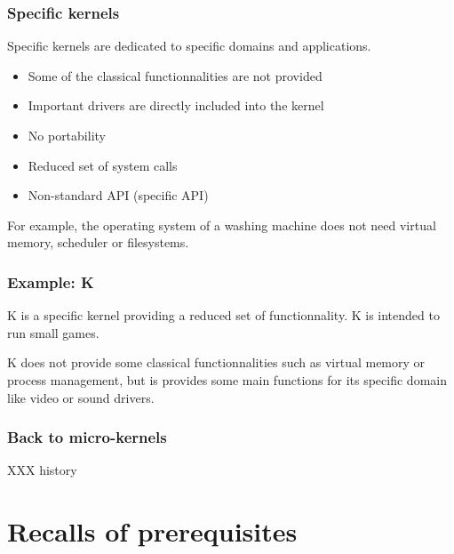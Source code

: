 %
%

\begin{frame}
  \frametitle{Specific kernels}

  Specific kernels are dedicated to specific domains and applications.

  \begin{itemize}
  \item
    Some of the classical functionnalities are not provided
  \item
    Important drivers are directly included into the kernel
  \item
    No portability
  \item
    Reduced set of system calls
  \item
    Non-standard API (specific API)
  \end{itemize}

  \-

  For example, the operating system of a washing machine does not need
  virtual memory, scheduler or filesystems.

\end{frame}

%
%

\begin{frame}
  \frametitle{Example: K}

  K is a specific kernel providing a reduced set of functionnality. K
  is intended to run small games.

  \begin{center}
  \end{center}

  K does not provide some classical functionnalities such as virtual
  memory or process management, but is provides some main functions
  for its specific domain like video or sound drivers.

\end{frame}

%
%

\begin{frame}
  \frametitle{Back to micro-kernels}

  XXX history

\end{frame}

%
%

\section{Recalls of prerequisites}

